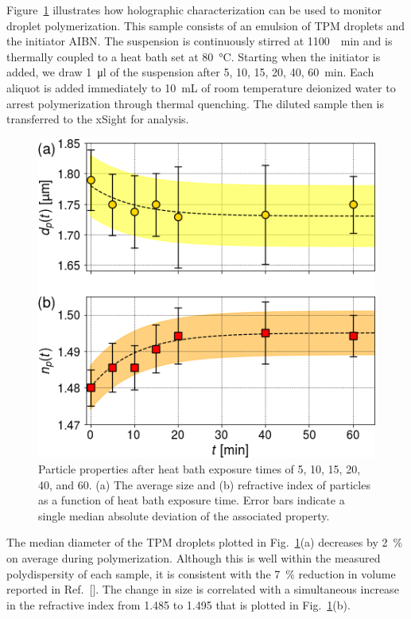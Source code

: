 \documentclass[journal=langd5,manuscript=article,layout=twocolumn]{achemso}
\newcommand{\FIXME}[1]{{\color{red} #1}}
\begin{document}
Figure~\ref{fig:heat_size_time} illustrates how
holographic characterization can be used to monitor
droplet polymerization.  This sample
consists of an emulsion of TPM droplets and 
the initiator AIBN.
The suspension is continuously stirred at 
\SI{1100}{\per\minute}
and is thermally coupled to a heat bath set at \SI{80}{\degreeCelsius}.
Starting when the initiator is added,
we draw \SI{1}{\ul} of the suspension after 
\num{5}, \num{10}, \num{15},
\num{20}, \num{40}, \SI{60}{\minute}.
Each aliquot is added immediately 
to \SI{10}{\milli\liter} of room temperature deionized water
to arrest polymerization through thermal quenching.
The diluted sample then is transferred to the xSight
for analysis.
\begin{figure}[!t]
    \centering
    \includegraphics[width=\columnwidth]{polymerization04}
    \caption{Particle properties after heat bath exposure times of \num{5}, \num{10}, \num{15}, \num{20}, \num{40}, and 
    \SI{60}{\min}.
      (a) The average size and (b) refractive index of particles as a function
      of heat bath exposure time. Error bars indicate a single median absolute deviation
      of the associated property.}
    \label{fig:heat_size_time}
\end{figure}

The median diameter of the TPM droplets plotted
in Fig.~\ref{fig:heat_size_time}(a)
decreases by \SI{2}{\percent} on average
during polymerization.
Although this is well within the
measured polydispersity of each sample, 
it is consistent with the \SI{7}{\percent} reduction
in volume reported in Ref.~[{\hspace*{-1ex}}].
The change in size is correlated with 
a simultaneous increase in the refractive index
from \num{1.485} to \num{1.495} that is
plotted in Fig.~\ref{fig:heat_size_time}(b).
\end{document}
